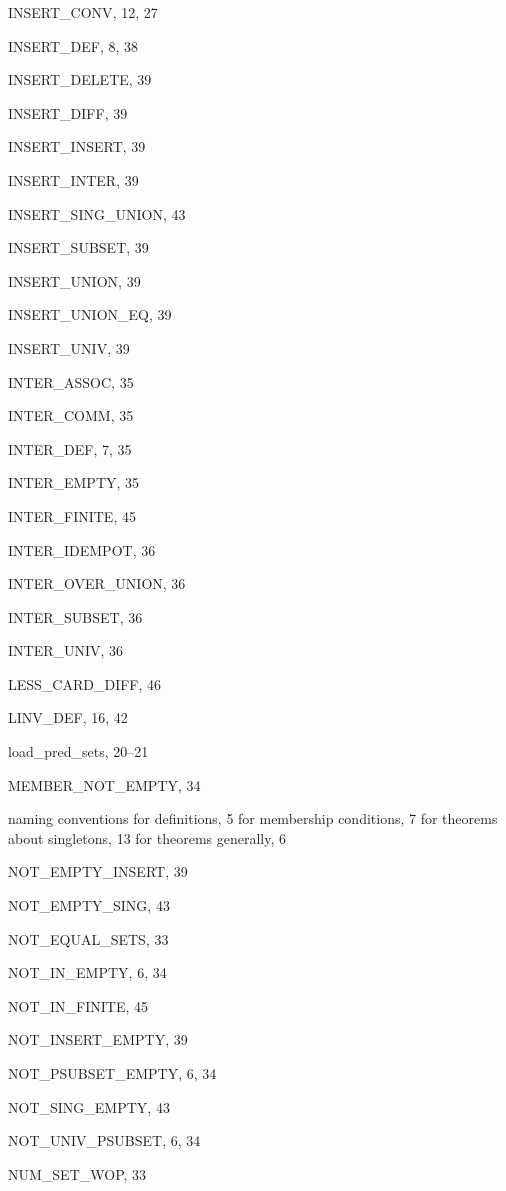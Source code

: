 \begin{theindex}
  \item {\ptt INSERT\_CONV}, 12, 27
  \item {\ptt INSERT\_DEF}, 8, 38
  \item {\ptt INSERT\_DELETE}, 39
  \item {\ptt INSERT\_DIFF}, 39
  \item {\ptt INSERT\_INSERT}, 39
  \item {\ptt INSERT\_INTER}, 39
  \item {\ptt INSERT\_SING\_UNION}, 43
  \item {\ptt INSERT\_SUBSET}, 39
  \item {\ptt INSERT\_UNION}, 39
  \item {\ptt INSERT\_UNION\_EQ}, 39
  \item {\ptt INSERT\_UNIV}, 39
  \item {\ptt INTER\_ASSOC}, 35
  \item {\ptt INTER\_COMM}, 35
  \item {\ptt INTER\_DEF}, 7, 35
  \item {\ptt INTER\_EMPTY}, 35
  \item {\ptt INTER\_FINITE}, 45
  \item {\ptt INTER\_IDEMPOT}, 36
  \item {\ptt INTER\_OVER\_UNION}, 36
  \item {\ptt INTER\_SUBSET}, 36
  \item {\ptt INTER\_UNIV}, 36

  \indexspace

  \item {\ptt LESS\_CARD\_DIFF}, 46
  \item {\ptt LINV\_DEF}, 16, 42
  \item {\ptt load\_pred\_sets}, 20--21

  \indexspace

  \item {\ptt MEMBER\_NOT\_EMPTY}, 34

  \indexspace

  \item naming conventions
    \subitem for definitions, 5
    \subitem for membership conditions, 7
    \subitem for theorems about singletons, 13
    \subitem for theorems generally, 6
  \item {\ptt NOT\_EMPTY\_INSERT}, 39
  \item {\ptt NOT\_EMPTY\_SING}, 43
  \item {\ptt NOT\_EQUAL\_SETS}, 33
  \item {\ptt NOT\_IN\_EMPTY}, 6, 34
  \item {\ptt NOT\_IN\_FINITE}, 45
  \item {\ptt NOT\_INSERT\_EMPTY}, 39
  \item {\ptt NOT\_PSUBSET\_EMPTY}, 6, 34
  \item {\ptt NOT\_SING\_EMPTY}, 43
  \item {\ptt NOT\_UNIV\_PSUBSET}, 6, 34
  \item {\ptt NUM\_SET\_WOP}, 33


\end{theindex}
